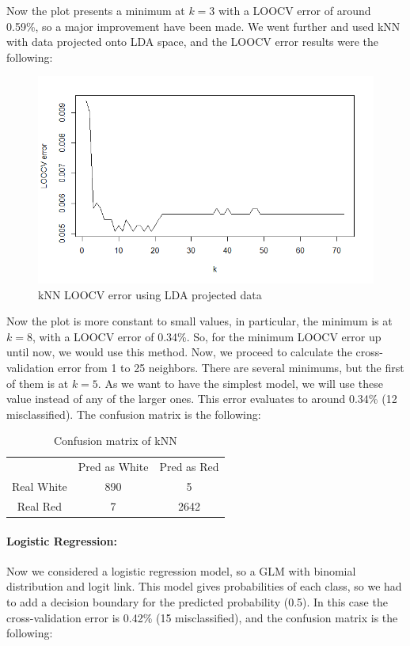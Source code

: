\documentclass[10pt]{article}
\begin{document}
Now the plot presents a minimum at $k=3$ with a LOOCV error of around 0.59\%, so a major improvement have been made. We went further and used kNN with data projected onto LDA space, and the LOOCV error results were the following:
\begin{figure}[H]
\centering
\caption{kNN LOOCV error using LDA projected data}
\includegraphics[scale=0.5]{kNN_LDA_LOOCV_error}
\end{figure}
Now the plot is more constant to small values, in particular, the minimum is at $k=8$, with a LOOCV error of 0.34\%. So, for the minimum LOOCV error up until now, we would use this method. Now, we proceed to calculate the cross-validation error from 1 to 25 neighbors. There are several minimums, but the first of them is at $k=5$. As we want to have the simplest model, we will use these value instead of any of the larger ones. This error evaluates to around 0.34\% (12 misclassified). The confusion matrix is the following:\\

\begin{table}[H]
\centering
\caption{Confusion matrix of kNN}
\begin{tabular}{ccc}
 & Pred as White & Pred as Red \\
Real White & 890 & 5 \\
Real Red  & 7 & 2642
\end{tabular}
\end{table}

\paragraph{Logistic Regression:} 
Now we considered a logistic regression model, so a GLM with binomial distribution and logit link. This model gives probabilities of each class, so we had to add a decision boundary for the predicted probability (0.5). In this case the cross-validation error is 0.42\% (15 misclassified), and the confusion matrix is the following:
\end{document}
